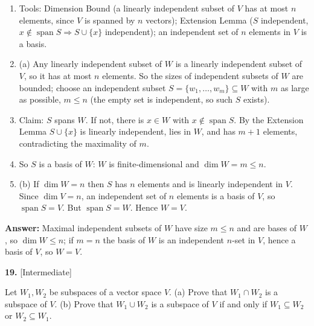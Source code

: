 \documentclass[11pt]{article}
\begin{document}
\begin{tcolorbox}[breakable,colback=ans,colframe=ansb,boxrule=0.5pt,left=4pt,right=4pt,top=2pt,bottom=2pt]\begin{enumerate}[leftmargin=3.1em,itemsep=1pt,topsep=1pt,label=\textbf{Step \arabic*.}]\item Tools: Dimension Bound (a linearly independent subset of $V$ has at most $n$ elements, since $V$ is spanned by $n$ vectors); Extension Lemma ($S$ independent, $x\notin\operatorname{span}S\Rightarrow S\cup\{x\}$ independent); an independent set of $n$ elements in $V$ is a basis.
\item (a) Any linearly independent subset of $W$ is a linearly independent subset of $V$, so it has at most $n$ elements. So the sizes of independent subsets of $W$ are bounded; choose an independent subset $S=\{w_1,\dots,w_m\}\subseteq W$ with $m$ as large as possible, $m\le n$ (the empty set is independent, so such $S$ exists).
\item Claim: $S$ spans $W$. If not, there is $x\in W$ with $x\notin\operatorname{span}S$. By the Extension Lemma $S\cup\{x\}$ is linearly independent, lies in $W$, and has $m+1$ elements, contradicting the maximality of $m$.
\item So $S$ is a basis of $W$: $W$ is finite-dimensional and $\dim W=m\le n$.
\item (b) If $\dim W=n$ then $S$ has $n$ elements and is linearly independent in $V$. Since $\dim V=n$, an independent set of $n$ elements is a basis of $V$, so $\operatorname{span}S=V$. But $\operatorname{span}S=W$. Hence $W=V$.
\end{enumerate}\textbf{Answer:} Maximal independent subsets of $W$ have size $m\le n$ and are bases of $W$, so $\dim W\le n$; if $m=n$ the basis of $W$ is an independent $n$-set in $V$, hence a basis of $V$, so $W=V$.\end{tcolorbox}
\par\vspace{2pt}
\begin{minipage}{\linewidth}\textbf{19.} \hfill{\scriptsize\color{ink}[Intermediate]}\par\nopagebreak Let $W_1,W_2$ be subspaces of a vector space $V$. (a) Prove that $W_1\cap W_2$ is a subspace of $V$. (b) Prove that $W_1\cup W_2$ is a subspace of $V$ if and only if $W_1\subseteq W_2$ or $W_2\subseteq W_1$.
\end{minipage}\par\nopagebreak
\end{document}

